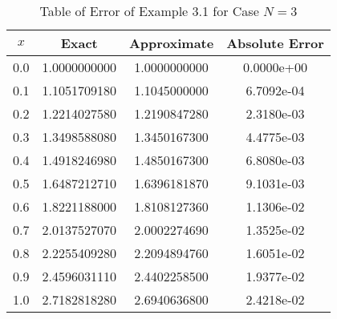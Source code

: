 \documentclass[12pt]{report}
\begin{document}
	\begin{table}[!hbt]
		\caption{Table of Error of Example 3.1 for Case $N=3$}
		\begin{center}
			\begin{tabular}{|c||c||c||c||}
				\hline
				$x$ & Exact & Approximate & Absolute Error\\ \hline
				0.0 & 1.0000000000 & 1.0000000000 & 0.0000e+00\\ \hline
				0.1 & 1.1051709180 & 1.1045000000 & 6.7092e-04\\ \hline
				0.2 & 1.2214027580 & 1.2190847280 & 2.3180e-03\\ \hline
				0.3 & 1.3498588080 & 1.3450167300 & 4.4775e-03\\ \hline
				0.4 & 1.4918246980 & 1.4850167300 & 6.8080e-03\\ \hline
				0.5 & 1.6487212710 & 1.6396181870 & 9.1031e-03\\ \hline
				0.6 & 1.8221188000 & 1.8108127360 & 1.1306e-02\\ \hline
				0.7 & 2.0137527070 & 2.0002274690 & 1.3525e-02\\ \hline
				0.8 & 2.2255409280 & 2.2094894760 & 1.6051e-02\\ \hline
				0.9 & 2.4596031110 & 2.4402258500 & 1.9377e-02\\ \hline
				1.0 & 2.7182818280 & 2.6940636800 & 2.4218e-02\\ \hline
			\end{tabular}
		\end{center}
		\label{tb:4_2}
	\end{table}	
\end{document}
